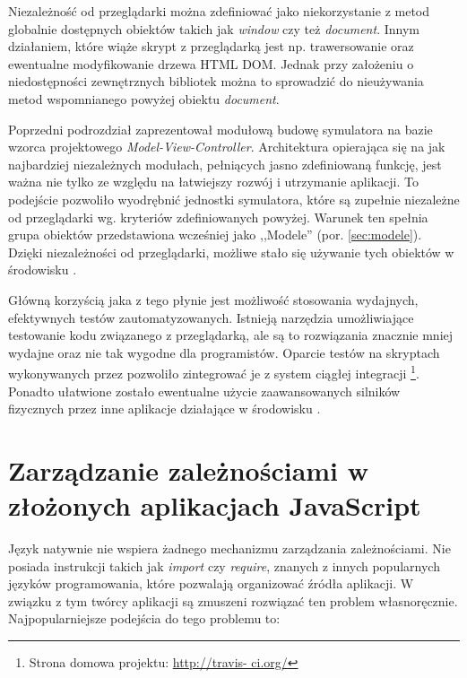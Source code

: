 Niezależność od przeglądarki można zdefiniować jako niekorzystanie z metod
globalnie dostępnych obiektów takich jak \emph{window} czy też
\emph{document}. Innym działaniem, które wiąże skrypt z przeglądarką jest np.
trawersowanie oraz ewentualne modyfikowanie drzewa HTML DOM. Jednak przy
założeniu o niedostępności zewnętrznych bibliotek można to sprowadzić do
nieużywania metod wspomnianego powyżej obiektu \emph{document}.

Poprzedni podrozdział zaprezentował modułową budowę symulatora \en na bazie
wzorca projektowego \emph{Model-View-Controller}. Architektura opierająca  się
na jak najbardziej niezależnych modułach, pełniących jasno zdefiniowaną
funkcję, jest ważna nie tylko ze względu na łatwiejszy rozwój i utrzymanie
aplikacji. To podejście pozwoliło wyodrębnić jednostki symulatora, które są
zupełnie niezależne od przeglądarki wg. kryteriów zdefiniowanych powyżej.
Warunek ten spełnia grupa obiektów przedstawiona wcześniej jako ,,Modele''
(por. \ref{sec:modele}). Dzięki niezależności od przeglądarki, możliwe stało
się używanie tych obiektów w środowisku .

Główną korzyścią jaka z tego płynie jest możliwość stosowania wydajnych,
efektywnych testów zautomatyzowanych. Istnieją narzędzia umożliwiające
testowanie kodu \js związanego z przeglądarką, ale są to rozwiązania znacznie
mniej wydajne oraz nie tak wygodne dla programistów. Oparcie testów na
skryptach wykonywanych przez  pozwoliło zintegrować je z system
ciągłej integracji \footnote{Strona domowa
projektu: \url{http://travis- ci.org/}}. Ponadto ułatwione zostało ewentualne
użycie zaawansowanych silników fizycznych \en przez inne aplikacje działające
w środowisku .

\section{Zarządzanie zależnościami w złożonych aplikacjach JavaScript}

Język \js natywnie nie wspiera żadnego mechanizmu zarządzania zależnościami. Nie
posiada instrukcji takich jak \emph{import} czy \emph{require}, znanych z innych
popularnych języków programowania, które pozwalają organizować źródła aplikacji.
W związku z tym twórcy aplikacji są zmuszeni rozwiązać ten problem
własnoręcznie. Najpopularniejsze podejścia do tego problemu to:

